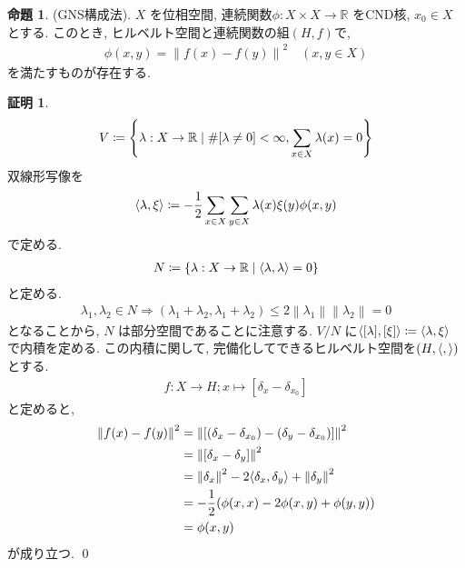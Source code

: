 \documentclass[10pt, fleqn, label-section=none]{bxjsarticle}
\theoremstyle{definition}
\newtheorem{prop}[dfn]{命題}
\newtheorem*{pf*}{証明}
\newcommand{\paren}[1]{\mleft( #1\mright )}
\newcommand{\cbra}[1]{\mleft\{#1\mright\}}
\newcommand{\tbra}[1]{\mleft\langle#1\mright\rangle}
\newcommand{\norm}[1]{\left\|#1\right\|}
\newcommand{\naraba}{\Rightarrow}
\renewcommand{\;}{\, ; \,}
\begin{document}
\begin{prop}(GNS構成法). $X$ を位相空間, 連続関数$\phi: X \times X \rightarrow \mathbb R$ をCND核, $x_0 \in X$とする. このとき, ヒルベルト空間と連続関数の組$(H, f)$で, 
\begin{align*} \phi(x, y) = \norm{f(x) - f(y)}^2 \quad (x, y \in X) \end{align*}
を満たすものが存在する. 
\end{prop}
\begin{pf*}
\begin{align*} V \coloneqq \cbra{ \lambda: X \rightarrow \mathbb R \mid \# [\lambda \neq 0] < \infty, \sum_{x \in X} \lambda(x) = 0 } \end{align*}
双線形写像を
\begin{align*} \tbra{\lambda, \xi} \coloneqq - \frac{1}{2} \sum_{x \in X}\sum_{y \in X} \lambda(x)\xi(y) \phi(x, y)   \end{align*}
で定める. 
\begin{align*} N \coloneqq \cbra{\lambda : X \rightarrow \mathbb R  \mid  \tbra{\lambda, \lambda} = 0 } \end{align*}
と定める. 
\begin{align*} \lambda_1, \lambda_2 \in N \naraba (\lambda_1 + \lambda_2, \lambda_1 + \lambda_2) \leq 2 \norm{\lambda_1} \norm{\lambda_2} = 0  \end{align*}
となることから, $N$ は部分空間であることに注意する. 
 $V / N $ に$ \tbra{[\lambda], [\xi] } \coloneqq \tbra{\lambda, \xi}$ で内積を定める. この内積に関して, 完備化してできるヒルベルト空間を$(H, \tbra{, })$ とする. 
\begin{align*} f: X \rightarrow H; x \mapsto [\delta_x - \delta_{x_0}]\end{align*}
と定めると, 
\begin{align*} \norm{f(x) - f(y)}^2 &= \norm{[ (\delta_x - \delta_{x_0}) -   (\delta_y - \delta_{x_0})    ]}^2 \\&= \norm{ [\delta_x - \delta_y]  }^2 \\&= \norm{\delta_x}^2 - 2\tbra{\delta_x, \delta_y} + \norm{\delta_y} ^2  \\&= -\frac{1}{2} \paren{\phi(x,x) - 2 \phi(x,y) + \phi(y,y)} \\&= \phi(x, y) \end{align*}
が成り立つ. 
\qed
\end{pf*}
\end{document}
